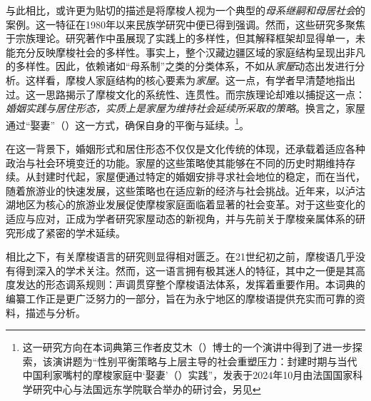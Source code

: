 与此相比，或许更为贴切的描述是将摩梭人视为一个典型的\emph{母系继嗣和母居社会}的案例。这一特征在1980年以来民族学研究中便已得到强调\parencite{zhanetal1980,yanetal1983,weng1993,shih1993,shih2010}。然而，这些研究多聚焦于宗族理论。研究著作中虽展现了实践上的多样性，但其解释框架却显得单一，未能充分反映摩梭社会的多样性。事实上，整个汉藏边疆区域的家庭结构呈现出非凡的多样性。因此，依赖诸如“母系制”之类的分类体系，不如从\emph{家屋}动态出发进行分析。这样看，摩梭人家庭结构的核心要素为\emph{家屋}。这一点，有学者早清楚地指出过\parencite{zhou_zigong_2003,hosana_2006}。这一思路揭示了摩梭文化的系统性、连贯性。而宗族理论却难以捕捉这一点：\emph{婚姻实践与居住形态，实质上是家屋为维持社会延续所采取的策略}。换言之，家屋通过“娶妻”（\emph{}）这一方式，确保自身的平衡与延续。\footnote{这一研究方向在本词典第三作者皮艾木（）博士的一个演讲中得到了进一步探索，该演讲题为“性别平衡策略与上层主导的社会重塑压力：封建时期与当代中国利家嘴村的摩梭家庭中‘娶妻’（\emph{}）实践”，发表于2024年10月由法国国家科学研究中心与法国远东学院联合举办的研讨会，另见\textcite{milan_na_2016}}。

在这一背景下，婚姻形式和居住形态不仅仅是文化传统的体现，还承载着适应各种政治与社会环境变迁的功能。家屋的这些策略使其能够在不同的历史时期维持存续。从封建时代起，家屋便通过特定的婚姻安排寻求社会地位的稳定，而在当代，随着旅游业的快速发展，这些策略也在适应新的经济与社会挑战。近年来，以泸沽湖地区为核心的旅游业发展促使摩梭家庭面临着显著的社会变革。对于这些变化的适应与应对，正成为学者研究家屋动态的新视角，并与先前关于摩梭亲属体系的研究形成了紧密的学术延续\parencite{walsh_living_2001,mattison2010,milan_tourisme_2019}。

相比之下，有关摩梭语言的研究则显得相对匮乏。在21世纪初之前，摩梭语几乎没有得到深入的学术关注。然而，这一语言拥有极其迷人的特征，其中之一便是其高度发达的形态调系规则：声调贯穿整个摩梭语法体系，发挥着重要作用\parencite{michaud2017}。本词典的编纂工作正是更广泛努力的一部分，旨在为永宁地区的摩梭语提供充实而可靠的资料，描述与分析。


